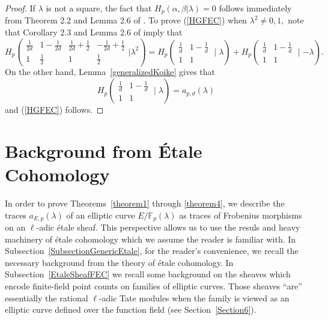 \documentclass[12pt]{amsart}
\theoremstyle{definition}
\theoremstyle{remark}
\numberwithin{equation}{section}
\def\F{{\mathbb F}}
\def\F{\mathbb{F}}
\begin{document}
\begin{proof}
    If $\lambda$ is not a square, the fact that $H_p(\alpha,\beta|\lambda)=0$ follows immediately from Theorem 2.2 and Lemma 2.6 of \cite{splittingRoots}.
    To prove (\ref{HGFEC}) when $\lambda^2\neq 0,1,$ note that Corollary 2.3 and Lemma 2.6 of \cite{splittingRoots} imply that
    $$
    H_p\left(\begin{array}{cccc}
    \frac{1}{2d} & 1-\frac{1}{2d} & \frac{1}{2d}+\frac{1}{2} & -\frac{1}{2d}+\frac{1}{2}  \\
     1 & \frac{1}{2} & 1 & \frac{1}{2}
\end{array}|\lambda^2\right) = H_p\left(\begin{array}{cc}
    \frac{1}{d} & 1-\frac{1}{d} \\
    1 & 1
\end{array}\mid\lambda\right)+H_p\left(\begin{array}{cc}
    \frac{1}{d} & 1-\frac{1}{d} \\
    1 & 1
\end{array}\mid-\lambda\right).
    $$
    On the other hand, Lemma~\ref{generalizedKoike} gives that
    $$
    H_p\left(\begin{array}{cc}
    \frac{1}{d} & 1-\frac{1}{d} \\
    1 & 1
\end{array}\mid\lambda\right) = a_{p,d}(\lambda)
    $$
    and (\ref{HGFEC}) follows.
\end{proof}

\section{Background from \'Etale Cohomology}\label{Section3}



In order to prove Theorems~\ref{theorem1} through \ref{theorem4}, we describe the traces $a_{E,p}(\lambda)$ of an elliptic curve $E/\F_p(\lambda)$ as traces of Frobenius morphisms on an $\ell$-adic \'etale sheaf. This perspective allows us to use the resuls and heavy machinery of \'etale cohomology which we assume the reader is familiar with.  In Subsection~\ref{SubsectionGenericEtale}, for the reader's convenience, we recall the necessary background from the theory of \'etale cohomology. In Subsection~\ref{EtaleSheafFEC} we recall some background on the sheaves which encode finite-field point counts on families of elliptic curves. Those sheaves ``are'' essentially the rational $\ell$-adic Tate modules when the family is viewed as an elliptic curve defined over the function field (see Section~\ref{Section6}).
\end{document}
